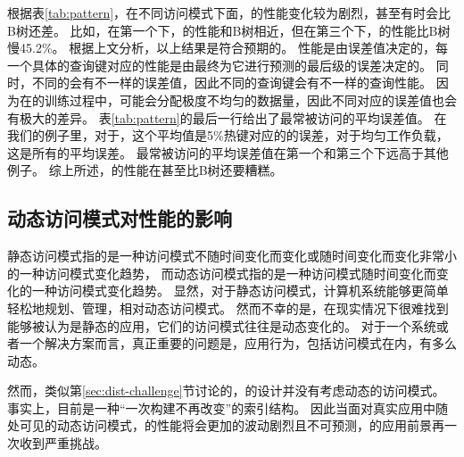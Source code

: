 根据表\ref{tab:pattern}，在不同访问模式下面，{\li}的性能变化较为剧烈，甚至有时会比B树还差。
比如，在第一个{\skewwl}下，{\li}的性能和B树相近，但在第三个{\skewwl}下，{\li}的性能比B树慢45.2\%。
根据上文分析，以上结果是符合预期的。
{\li}性能是由误差值决定的，每一个具体的查询键对应的性能是由最终为它进行预测的最后级{\model}的误差决定的。
同时，不同的{\model}会有不一样的误差值，因此不同的查询键会有不一样的查询性能。
因为在{\rmi}的训练过程中，{\model}可能会分配极度不均匀的数据量，因此不同{\model}对应的误差值也会有极大的差异。
表\ref{tab:pattern}的最后一行给出了最常被访问{\model}的平均误差值。
在我们的例子里，对于{\skewwl}，这个平均值是5\%热键对应的{\model}的误差，对于均匀工作负载，这是所有{\model}的平均误差。
最常被访问{\model}的平均误差值在第一个{\skewwl}和第三个{\skewwl}下远高于其他例子。
综上所述，{\li}的性能在{\skewwl}甚至比B树还要糟糕。


\subsection{动态访问模式对{\li}性能的影响}

静态访问模式指的是一种访问模式不随时间变化而变化或随时间变化而变化非常小的一种访问模式变化趋势，
而动态访问模式指的是一种访问模式随时间变化而变化的一种访问模式变化趋势。
显然，对于静态访问模式，计算机系统能够更简单轻松地规划、管理，相对动态访问模式。
然而不幸的是，在现实情况下很难找到能够被认为是静态的应用，它们的访问模式往往是动态变化的。
对于一个系统或者一个解决方案而言，真正重要的问题是，应用行为，包括访问模式在内，有多么动态。


然而，类似第\ref{sec:dist-challenge}节讨论的，{\li}的设计并没有考虑动态的访问模式。
事实上，{\li}目前是一种``一次构建不再改变''的索引结构。
因此当面对真实应用中随处可见的动态访问模式，{\li}的性能将会更加的波动剧烈且不可预测，{\li}的应用前景再一次收到严重挑战。
